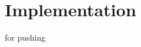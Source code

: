 \section{Implementation}\label{sec:Implementation}
for pushing
\newcommand{\bx}{\mathbf{x}}
\newcommand{\by}{\mathbf{y}}

%



